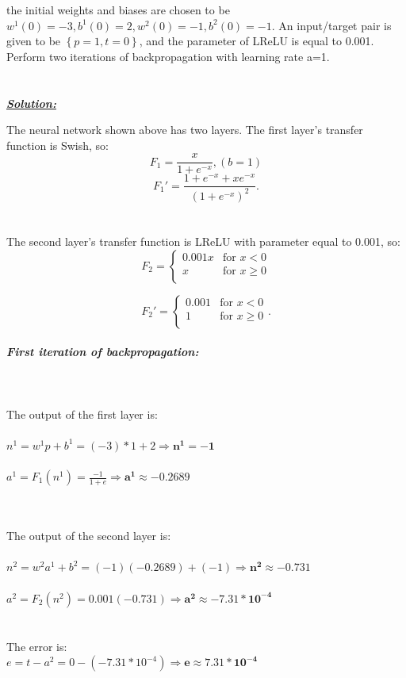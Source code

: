 \documentclass{article}
\begin{document}
\noindent the initial weights and biases are chosen to be $w^1(0) = -3, b^1(0) = 2, w^2(0) = -1, b^2(0) = -1$. An input/target pair is given to be ${\left \{p = 1, t=0 \right \} }$, and the parameter of LReLU is equal to 0.001. Perform two iterations of backpropagation with learning rate a=1.  \\ \\ \\


\noindent \underline{\textbf{\textit{Solution:}}}

\noindent The neural network shown above has two layers. The first layer's transfer function is Swish, so:
\[ F_1 = \frac{x}{1+e^{-x}}, (b=1) \]  
\[ F_1' = \frac{1+e^{-x} + xe^{-x}}{(1+e^{-x})^2}. \]
\\ \\The second layer's transfer function is LReLU with parameter equal to 0.001, so:
\[ F_2 = \begin{cases}
  0.001x & \text{for } x < 0 \\
  x & \text{for } x \geq 0 \\
\end{cases} \]
 
\[ F_2' = \begin{cases}
  0.001 & \text{for } x < 0 \\
  1 & \text{for } x \geq 0 \\
\end{cases}. \]\\

\noindent \textbf{\textit{First iteration of backpropagation:}}
\noindent \\ \\ \\ \\The output of the first layer is: \\ \\$n^1 = w^1p + b^1 = (-3)*1 + 2 \Rightarrow \bm{n^1 = -1}$
\\ \\$a^1 = F_1(n^1) = \frac{-1}{1+e} \Rightarrow \bm{a^1 \approx -0.2689}$

\noindent \\ \\The output of the second layer is: \\ \\$n^2 = w^2a^1 + b^2 = (-1)(-0.2689) + (-1) \Rightarrow \bm{n^2 \approx -0.731}$
\\ \\$a^2 = F_2(n^2) = 0.001(-0.731) \Rightarrow \bm{a^2 \approx -7.31 * 10^{-4}}$
\\ \\ \\The error is: \\$e = t - a^2 = 0 - (-7.31 * 10^{-4}) \Rightarrow \bm{e \approx 7.31 * 10^{-4}}$ \\ \\
 
\end{document}

